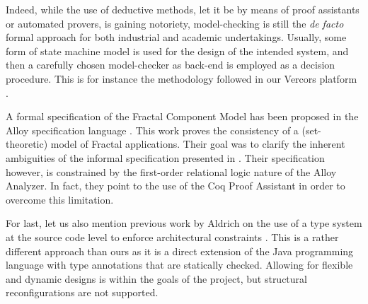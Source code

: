 				
     	
	Indeed, while the use of deductive methods, let it be by means of proof assistants 
	or automated provers, is gaining notoriety, model-checking is still
	the \textit{de facto} formal approach for both industrial and academic undertakings.
	Usually, some form of state machine model is used for the design of the intended
	system,  and then a carefully chosen model-checker as back-end is employed as
	a decision procedure. This is for instance the methodology followed in our Vercors
	platform \cite{Barros20073}. 
	

   	A formal specification of the Fractal Component Model has 
   	been proposed in the  Alloy specification language \cite{MERLE:2008:INRIA-00338987:1}. 
	This work proves the consistency of a (set-theoretic) model of Fractal applications. 	 
	Their goal was to clarify the inherent ambiguities of the informal specification presented
  	in \cite{fractalSpec}. Their specification however, is constrained by the first-order relational logic nature 
   	of the Alloy Analyzer. In fact, they point to the use of the Coq Proof Assistant in order 
   	to overcome this limitation.	
	
	
	For last, let us also mention previous work by Aldrich on the use of a type system at the source code level to 
	enforce architectural constraints \cite{Abi-antoun08staticconformance}. This is a rather different
	approach than ours as it is a direct extension of the Java programming language with type annotations
	that are statically checked. Allowing for flexible and dynamic designs is within the goals of the project,	
	but structural reconfigurations are not supported.





	


